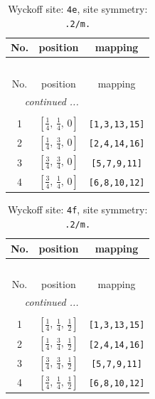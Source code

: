 \documentclass[fleqn,8pt]{jsarticle}
\begin{document}
\renewcommand{\arraystretch}{1.2}
\begin{longtable}{ccc}
\caption{Wyckoff site: {\tt 4e}, site symmetry: {\tt .2/m.}}
 \\
 \hline \hline
No. & position & mapping \\ \hline \endfirsthead

\multicolumn{2}{l}{\tablename\ \thetable{}} \\
 \hline \hline
No. & position & mapping \\ \hline \endhead

 \hline \hline
\multicolumn{2}{r}{\footnotesize\it continued ...} \\ \endfoot

 \hline \hline
\multicolumn{2}{r}{} \\ \endlastfoot

1 & $\left[ \frac{1}{4},\, \frac{1}{4},\, 0 \right]$ & {\tt [1,3,13,15]} \\ \hline
2 & $\left[ \frac{1}{4},\, \frac{3}{4},\, 0 \right]$ & {\tt [2,4,14,16]} \\ \hline
3 & $\left[ \frac{3}{4},\, \frac{3}{4},\, 0 \right]$ & {\tt [5,7,9,11]} \\ \hline
4 & $\left[ \frac{3}{4},\, \frac{1}{4},\, 0 \right]$ & {\tt [6,8,10,12]} \\
\end{longtable}
\renewcommand{\arraystretch}{1.2}
\begin{longtable}{ccc}
\caption{Wyckoff site: {\tt 4f}, site symmetry: {\tt .2/m.}}
 \\
 \hline \hline
No. & position & mapping \\ \hline \endfirsthead

\multicolumn{2}{l}{\tablename\ \thetable{}} \\
 \hline \hline
No. & position & mapping \\ \hline \endhead

 \hline \hline
\multicolumn{2}{r}{\footnotesize\it continued ...} \\ \endfoot

 \hline \hline
\multicolumn{2}{r}{} \\ \endlastfoot

1 & $\left[ \frac{1}{4},\, \frac{1}{4},\, \frac{1}{2} \right]$ & {\tt [1,3,13,15]} \\ \hline
2 & $\left[ \frac{1}{4},\, \frac{3}{4},\, \frac{1}{2} \right]$ & {\tt [2,4,14,16]} \\ \hline
3 & $\left[ \frac{3}{4},\, \frac{3}{4},\, \frac{1}{2} \right]$ & {\tt [5,7,9,11]} \\ \hline
4 & $\left[ \frac{3}{4},\, \frac{1}{4},\, \frac{1}{2} \right]$ & {\tt [6,8,10,12]} \\
\end{longtable}
\end{document}
